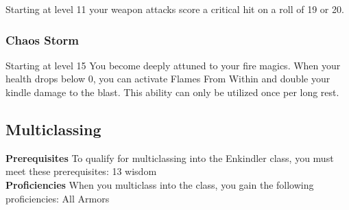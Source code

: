 Starting at level 11 your weapon attacks score a critical hit on a roll of 19 or 20.

\subsubsection{Chaos Storm}

Starting at level 15 You become deeply attuned to your fire magics. When your health drops below 0, you can activate Flames From Within and double your kindle damage to the blast. This ability can only be utilized once per long rest.

\subsection{Multiclassing}
\textbf{Prerequisites} To qualify for multiclassing into the Enkindler class, you must meet these prerequisites: 13 wisdom\\
\textbf{Proficiencies}  When you multiclass into the class, you gain the following proficiencies: All Armors\\